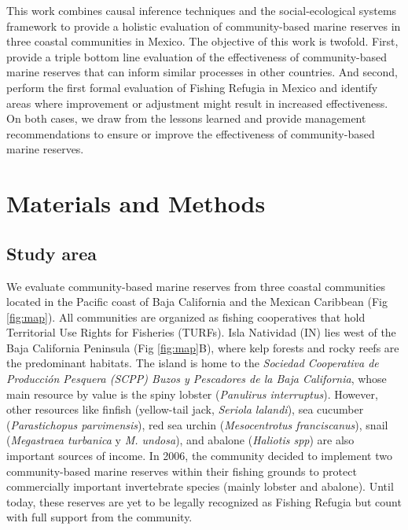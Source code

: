 \documentclass{frontiersSCNS}
\theoremstyle{definition}
\theoremstyle{definition}
\theoremstyle{definition}
\theoremstyle{remark}
\begin{document}
This work combines causal inference techniques and the social-ecological
systems framework to provide a holistic evaluation of community-based
marine reserves in three coastal communities in Mexico. The objective of
this work is twofold. First, provide a triple bottom line evaluation of
the effectiveness of community-based marine reserves that can inform
similar processes in other countries. And second, perform the first
formal evaluation of Fishing Refugia in Mexico and identify areas where
improvement or adjustment might result in increased effectiveness. On
both cases, we draw from the lessons learned and provide management
recommendations to ensure or improve the effectiveness of
community-based marine reserves.

\section{Materials and Methods}\label{materials-and-methods}

\subsection{Study area}\label{study-area}

We evaluate community-based marine reserves from three coastal
communities located in the Pacific coast of Baja California and the
Mexican Caribbean (Fig \ref{fig:map}). All communities are organized as
fishing cooperatives that hold Territorial Use Rights for Fisheries
(TURFs). Isla Natividad (IN) lies west of the Baja California Peninsula
(Fig \ref{fig:map}B), where kelp forests and rocky reefs are the
predominant habitats. The island is home to the \emph{Sociedad
Cooperativa de Producción Pesquera (SCPP) Buzos y Pescadores de la Baja
California}, whose main resource by value is the spiny lobster
(\emph{Panulirus interruptus}). However, other resources like finfish
(yellow-tail jack, \emph{Seriola lalandi}), sea cucumber
(\emph{Parastichopus parvimensis}), red sea urchin (\emph{Mesocentrotus
franciscanus}), snail (\emph{Megastraea turbanica} y \emph{M. undosa}),
and abalone (\emph{Haliotis spp}) are also important sources of income.
In 2006, the community decided to implement two community-based marine
reserves within their fishing grounds to protect commercially important
invertebrate species (mainly lobster and abalone). Until today, these
reserves are yet to be legally recognized as Fishing Refugia but count
with full support from the community.
\end{document}
